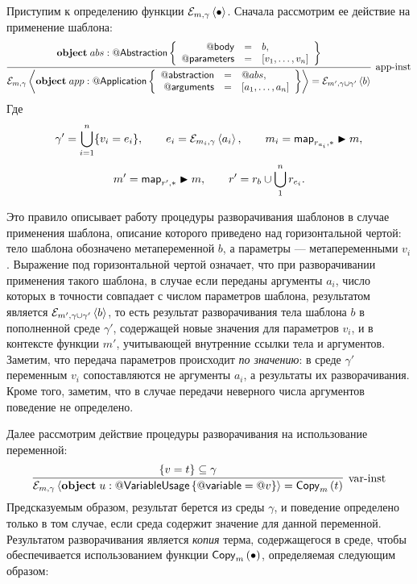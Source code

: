 Приступим к определению функции $\mathcal{E}_{m, \gamma} \left\langle \bullet \right\rangle$. Сначала рассмотрим ее действие на применение шаблона:
{\small
$$
\trule{
	\Object{abs}{\RefSt{Abstraction}}{
		\begin{array}{rcl}
			\RefSt{body} &=& b,\\
			\RefSt{parameters} &=& \List{v_1, \ldots, v_n}\\
		\end{array}	
	}
}{
	\Inst{\gamma}{
		\Object{app}{\RefSt{Application}}{
			\begin{array}{rcl}
				\RefSt{abstraction} &=& \Ref{abs},\\
				\RefSt{arguments} &=& \List{a_1, \ldots, a_n}
			\end{array}	
		}
	} = \InstC{m'}{\gamma \cup \gamma'}{b}
}{app-inst}
$$}
Где $$\gamma' = \bigcup\limits_{i=1}^{n} \{ v_i = e_i \}, \qquad e_i = 
\mathcal{E}_{m_i, \gamma} \left\langle a_i \right\rangle, \qquad m_i = \mathsf{map}_{r_{a_i}, *} \blacktriangleright m,
$$
$$m' = \mathsf{map}_{r', *} \blacktriangleright m, \qquad
r' = r_b \cup \bigcup\limits_{1}^{n} r_{e_i}.$$

Это правило описывает работу процедуры разворачивания шаблонов в случае применения шаблона, описание которого приведено над горизонтальной чертой: тело шаблона обозначено метапеременной $b$, а параметры --- метапеременными $v_i$. Выражение под горизонтальной чертой означает, что при разворачивании применения такого шаблона, в случае если переданы аргументы $a_i$, число которых в точности совпадает с числом параметров шаблона, результатом является $\mathcal{E}_{m', \gamma \cup \gamma'} \left\langle b \right\rangle$, то есть результат разворачивания тела шаблона $b$ в пополненной среде $\gamma'$, содержащей новые значения для параметров $v_i$, и в контексте функции $m'$, учитывающей внутренние ссылки тела и аргументов. Заметим, что передача параметров происходит \emph{по значению}: в среде $\gamma'$ переменным $v_i$ сопоставляются не аргументы $a_i$, а результаты их разворачивания. Кроме того, заметим, что в случае передачи неверного числа аргументов поведение не определено.

Далее рассмотрим действие процедуры разворачивания на использование переменной:
$$
\trule{
	\{v = t\} \subseteq \gamma
}{
	\Inst{\gamma}{\Object{u}{\RefSt{VariableUsage}}{\RefSt{variable} = \Ref{v}}} = \Copy{t}
}{var-inst}
$$ 
Предсказуемым образом, результат берется из среды $\gamma$, и поведение определено только в том случае, если среда содержит значение для данной переменной. Результатом разворачивания является \emph{копия} терма, содержащегося в среде, чтобы обеспечивается использованием функции $\mathsf{Copy}_{m}\left(\bullet\right)$, определяемая следующим образом:

